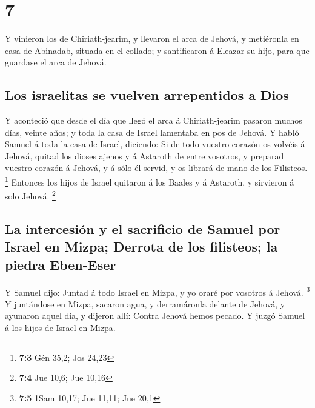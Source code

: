 \hypertarget{section-6}{%
\section{7}\label{section-6}}

 Y vinieron los de Chîriath-jearim, y llevaron el arca de
Jehová, y metiéronla en casa de Abinadab, situada en el collado; y
santificaron á Eleazar su hijo, para que guardase el arca de Jehová.

\hypertarget{los-israelitas-se-vuelven-arrepentidos-a-dios}{%
\subsection{Los israelitas se vuelven arrepentidos a
Dios}\label{los-israelitas-se-vuelven-arrepentidos-a-dios}}

 Y aconteció que desde el día que llegó el arca á
Chîriath-jearim pasaron muchos días, veinte años; y toda la casa de
Israel lamentaba en pos de Jehová.  Y habló Samuel á toda la
casa de Israel, diciendo: Si de todo vuestro corazón os volvéis á
Jehová, quitad los dioses ajenos y á Astaroth de entre vosotros, y
preparad vuestro corazón á Jehová, y á sólo él servid, y os librará de
mano de los Filisteos. \footnote{\textbf{7:3} Gén 35,2; Jos 24,23}
 Entonces los hijos de Israel quitaron á los Baales y á
Astaroth, y sirvieron á solo Jehová. \footnote{\textbf{7:4} Jue 10,6;
  Jue 10,16}

\hypertarget{la-intercesiuxf3n-y-el-sacrificio-de-samuel-por-israel-en-mizpa-derrota-de-los-filisteos-la-piedra-eben-eser}{%
\subsection{La intercesión y el sacrificio de Samuel por Israel en
Mizpa; Derrota de los filisteos; la piedra
Eben-Eser}\label{la-intercesiuxf3n-y-el-sacrificio-de-samuel-por-israel-en-mizpa-derrota-de-los-filisteos-la-piedra-eben-eser}}

 Y Samuel dijo: Juntad á todo Israel en Mizpa, y yo oraré
por vosotros á Jehová. \footnote{\textbf{7:5} 1Sam 10,17; Jue 11,11; Jue
  20,1}  Y juntándose en Mizpa, sacaron agua, y derramáronla
delante de Jehová, y ayunaron aquel día, y dijeron allí: Contra Jehová
hemos pecado. Y juzgó Samuel á los hijos de Israel en Mizpa.

